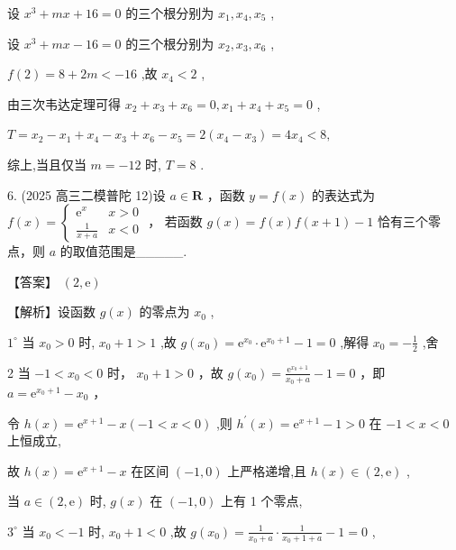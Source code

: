\documentclass[10pt]{article}
\begin{document}
设 \({x}^{3} + {mx} + {16} = 0\) 的三个根分别为 \({x}_{1},{x}_{4},{x}_{5}\) ,

设 \({x}^{3} + {mx} - {16} = 0\) 的三个根分别为 \({x}_{2},{x}_{3},{x}_{6}\) ,

\(f\left( 2\right)  = 8 + {2m} <  - {16}\) ,故 \({x}_{4} < 2\) ,

由三次韦达定理可得 \({x}_{2} + {x}_{3} + {x}_{6} = 0,{x}_{1} + {x}_{4} + {x}_{5} = 0\) ,

\(T = {x}_{2} - {x}_{1} + {x}_{4} - {x}_{3} + {x}_{6} - {x}_{5} = 2\left( {{x}_{4} - {x}_{3}}\right)  = 4{x}_{4} < 8,\)

综上,当且仅当 \(m =  - {12}\) 时, \(T = 8\) .

6. (2025 高三二模普陀 12)设 \(a \in  \mathbf{R}\) ，函数 \(y = f\left( x\right)\) 的表达式为 \(f\left( x\right)  = \left\{  \begin{matrix} {\mathrm{e}}^{x} & x > 0 \\  \frac{1}{x + a} & x < 0 \end{matrix}\right.\) ， 若函数 \(g\left( x\right)  = f\left( x\right) f\left( {x + 1}\right)  - 1\) 恰有三个零点，则 \(a\) 的取值范围是\_\_\_\_\_.

【答案】 \(\left( {2,\mathrm{e}}\right)\)

【解析】设函数 \(g\left( x\right)\) 的零点为 \({x}_{0}\) ,

\({1}^{ \circ  }\) 当 \({x}_{0} > 0\) 时, \({x}_{0} + 1 > 1\) ,故 \(g\left( {x}_{0}\right)  = {\mathrm{e}}^{{x}_{0}} \cdot  {\mathrm{e}}^{{x}_{0} + 1} - 1 = 0\) ,解得 \({x}_{0} =  - \frac{1}{2}\) ,舍

2 \textdegree  当 \(- 1 < {x}_{0} < 0\) 时， \({x}_{0} + 1 > 0\) ，故 \(g\left( {x}_{0}\right)  = \frac{{\mathrm{e}}^{{x}_{0} + 1}}{{x}_{0} + a} - 1 = 0\) ，即 \(a = {\mathrm{e}}^{{x}_{0} + 1} - {x}_{0}\) ，

令 \(h\left( x\right)  = {\mathrm{e}}^{x + 1} - x\left( {-1 < x < 0}\right)\) ,则 \({h}^{\prime }\left( x\right)  = {\mathrm{e}}^{x + 1} - 1 > 0\) 在 \(- 1 < x < 0\) 上恒成立,

故 \(h\left( x\right)  = {\mathrm{e}}^{x + 1} - x\) 在区间 \(\left( {-1,0}\right)\) 上严格递增,且 \(h\left( x\right)  \in  \left( {2,\mathrm{e}}\right)\) ,

当 \(a \in  \left( {2,\mathrm{e}}\right)\) 时, \(g\left( x\right)\) 在 \(\left( {-1,0}\right)\) 上有 1 个零点,

\({3}^{ \circ  }\) 当 \({x}_{0} <  - 1\) 时, \({x}_{0} + 1 < 0\) ,故 \(g\left( {x}_{0}\right)  = \frac{1}{{x}_{0} + a} \cdot  \frac{1}{{x}_{0} + 1 + a} - 1 = 0\) ,
\end{document}
